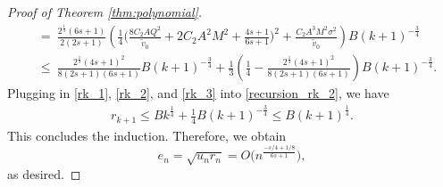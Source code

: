 \begin{proof}[Proof of Theorem \ref{thm:polynomial}]
\begin{align}
    &=~ \frac{2^{\frac{1}{3}}(6s+1)}{2(2s+1)}\left(\frac{1}{4} \bigg(\frac{8C_2AQ^2}{\tilde v_0} + 2C_2A^2M^2+\frac{4s+1}{6s+1} \bigg)^2 + \frac{C_2A^3M^2\sigma^2}{\tilde v_0} \right)B(k+1)^{-\frac{3}{4}}\\
    &\leq~ \frac{2^{\frac{1}{3}}(4s+1)^2}{8(2s+1)(6s+1)}B(k+1)^{-\frac{3}{4}} + \frac{1}{3}\left(\frac{1}{4} - \frac{2^{\frac{1}{3}}(4s+1)^2}{8(2s+1)(6s+1)}\right)B(k+1)^{-\frac{3}{4}}. \label{rk_3} 
\end{align}
Plugging in \eqref{rk_1}, \eqref{rk_2}, and \eqref{rk_3} into \eqref{recursion_rk_2}, we have
\begin{align}
    r_{k+1} \leq Bk^{\frac{1}{4}} + \frac{1}{4}B(k+1)^{-\frac{3}{4}} \leq B(k+1)^{\frac{1}{4}}.
\end{align}
This concludes the induction. Therefore, we obtain
\begin{equation}
e_n = \sqrt{u_nr_n}  = O\Big(n^{\frac{-s/4+1/8}{6s+1}}\Big),
\end{equation}
as desired.
\end{proof}
